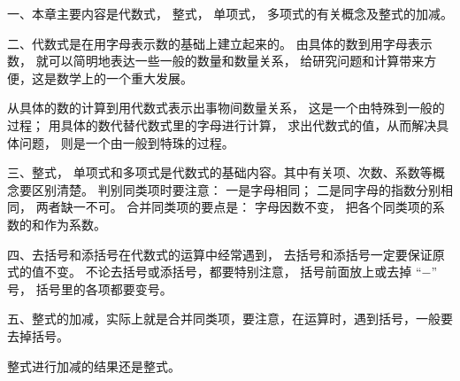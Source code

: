 \xiaojie

一、本章主要内容是代数式， 整式， 单项式， 多项式的有关概念及整式的加减。

二、代数式是在用字母表示数的基础上建立起来的。
由具体的数到用字母表示数， 就可以简明地表达一些一般的数量和数量关系，
给研究问题和计算带来方便，这是数学上的一个重大发展。

从具体的数的计算到用代数式表示出事物间数量关系， 这是一个由特殊到一般的过程；
用具体的数代替代数式里的字母进行计算， 求出代数式的值，从而解决具体问题， 则是一个由一般到特珠的过程。

三、整式， 单项式和多项式是代数式的基础内容。其中有关项、次数、系数等概念要区别清楚。
判别同类项时要注意： 一是字母相同； 二是同字母的指数分别相同， 两者缺一不可。
合并同类项的要点是： 字母因数不变， 把各个同类项的系数的和作为系数。

四、去括号和添括号在代数式的运算中经常遇到， 去括号和添括号一定要保证原式的值不变。
不论去括号或添括号，都要特别注意， 括号前面放上或去掉 “$-$” 号， 括号里的各项都要变号。

五、整式的加减，实际上就是合并同类项，要注意，在运算时，遇到括号，一般要去掉括号。

整式进行加减的结果还是整式。

